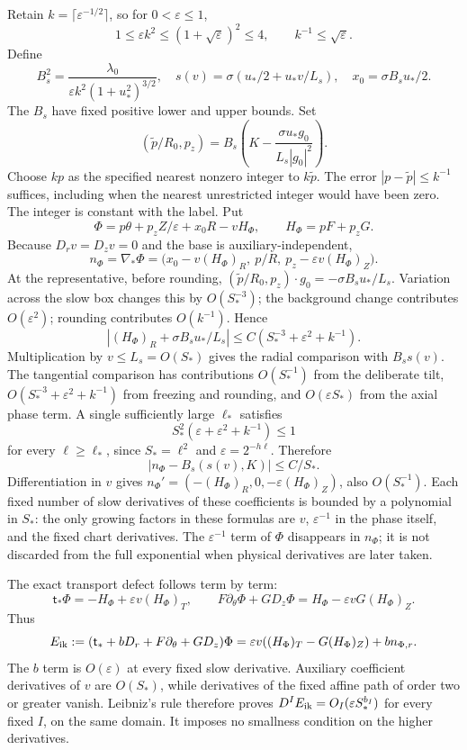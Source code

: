 \documentclass[10pt,a4paper]{article}
\begin{document}
Retain \(k=\lceil\varepsilon^{-1/2}\rceil\), so for \(0<\varepsilon\le1\), \[
1\le\varepsilon k^2\le(1+\sqrt\varepsilon)^2\le4,\qquad
k^{-1}\le\sqrt\varepsilon.
\] Define \[
B_s^2=\frac{\lambda_0}{\varepsilon k^2(1+u_*^2)^{3/2}},
\quad s(v)=\sigma(u_*/2+u_*v/L_s),\quad x_0=\sigma B_su_*/2.
\] The \(B_s\) have fixed positive lower and upper bounds. Set \[
(\widetilde p/R_0,p_z)
=B_s\left(K-\frac{\sigma u_*g_0}{L_s|g_0|^2}\right).
\] Choose \(kp\) as the specified nearest nonzero integer to \(k\widetilde p\). The error \(|p-\widetilde p|\le k^{-1}\) suffices, including when the nearest unrestricted integer would have been zero. The integer is constant with the label. Put \[
\Phi=p\theta+p_zZ/\varepsilon+x_0R-vH_\Phi,\qquad H_\Phi=pF+p_zG.
\] Because \(D_rv=D_zv=0\) and the base is auxiliary-independent, \[
n_\Phi=\nabla_*\Phi
=\bigl(x_0-v(H_\Phi)_R,\ p/R,\ p_z-\varepsilon v(H_\Phi)_Z\bigr).
\] At the representative, before rounding, \((\widetilde p/R_0,p_z)\cdot g_0=-\sigma B_su_*/L_s\). Variation across the slow box changes this by \(O(S_*^{-3})\); the background change contributes \(O(\varepsilon^2)\); rounding contributes \(O(k^{-1})\). Hence \[
|(H_\Phi)_R+\sigma B_su_*/L_s|
\le C(S_*^{-3}+\varepsilon^2+k^{-1}).
\] Multiplication by \(v\le L_s=O(S_*)\) gives the radial comparison with \(B_ss(v)\). The tangential comparison has contributions \(O(S_*^{-1})\) from the deliberate tilt, \(O(S_*^{-3}+\varepsilon^2+k^{-1})\) from freezing and rounding, and \(O(\varepsilon S_*)\) from the axial phase term. A single sufficiently large \(\ell_*\) satisfies \[
S_*^2(\varepsilon+\varepsilon^2+k^{-1})\le1
\] for every \(\ell\ge\ell_*\), since \(S_*=\ell^2\) and \(\varepsilon=2^{-h\ell}\). Therefore \[
|n_\Phi-B_s(s(v),K)|\le C/S_*.
\] Differentiation in \(v\) gives \(n_\Phi'=(-(H_\Phi)_R,0,-\varepsilon(H_\Phi)_Z)\), also \(O(S_*^{-1})\). Each fixed number of slow derivatives of these coefficients is bounded by a polynomial in \(S_*\): the only growing factors in these formulas are \(v\), \(\varepsilon^{-1}\) in the phase itself, and the fixed chart derivatives. The \(\varepsilon^{-1}\) term of \(\Phi\) disappears in \(n_\Phi\); it is not discarded from the full exponential when physical derivatives are later taken.

The exact transport defect follows term by term: \[
\mathsf t_*\Phi=-H_\Phi+\varepsilon v(H_\Phi)_T,\qquad
F\partial_\theta\Phi+GD_z\Phi=H_\Phi-\varepsilon vG(H_\Phi)_Z.
\] Thus \[
E_{\rm ik}:=(\mathsf t_*+bD_r+F\partial_\theta+GD_z)\Phi
=\varepsilon v((H_\Phi)_T-G(H_\Phi)_Z)+bn_{\Phi,r}.
\] The \(b\) term is \(O(\varepsilon)\) at every fixed slow derivative. Auxiliary coefficient derivatives of \(v\) are \(O(S_*)\), while derivatives of the fixed affine path of order two or greater vanish. Leibniz's rule therefore proves \(D^IE_{\rm ik}=O_I(\varepsilon S_*^{b_I})\) for every fixed \(I\), on the same domain. It imposes no smallness condition on the higher derivatives.
\end{document}
